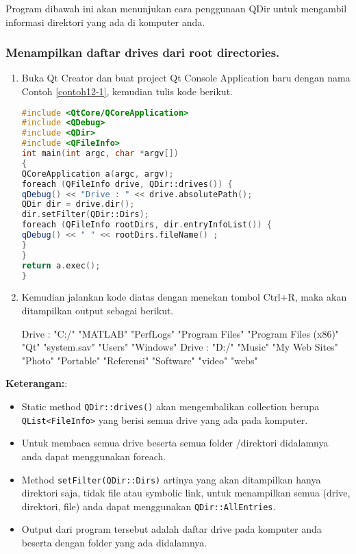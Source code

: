 Program dibawah ini akan menunjukan cara penggunaan QDir untuk mengambil
informasi direktori yang ada di komputer anda.

\subsubsection*{Menampilkan daftar drives dari root directories.}

\begin{enumerate}

\item
  Buka Qt Creator dan buat project Qt Console Application baru dengan
  nama Contoh \ref{contoh12-1}, kemudian tulis kode berikut.

\begin{lstlisting}[language=c++, caption=Menampilkan daftar drives dari root directories., label=contoh12-1]
#include <QtCore/QCoreApplication>
#include <QDebug>
#include <QDir>
#include <QFileInfo>
int main(int argc, char *argv[])
{
QCoreApplication a(argc, argv);
foreach (QFileInfo drive, QDir::drives()) {
qDebug() << "Drive : " << drive.absolutePath();
QDir dir = drive.dir();
dir.setFilter(QDir::Dirs);
foreach (QFileInfo rootDirs, dir.entryInfoList()) {
qDebug() << " " << rootDirs.fileName() ;
}
}
return a.exec();
}
\end{lstlisting}
\item
  Kemudian jalankan kode diatas dengan menekan tombol Ctrl+R, maka akan
  ditampilkan output sebagai berikut.
  \begin{lcverbatim}
Drive :  "C:/"
  "MATLAB"
  "PerfLogs"
  "Program Files"
  "Program Files (x86)"
  "Qt"
  "system.sav"
  "Users"
  "Windows"
Drive :  "D:/"
  "Music"
  "My Web Sites"
  "Photo"
  "Portable"
  "Referensi"
  "Software"
  "video"
  "webs"

\end{lcverbatim}
\end{enumerate}

\textbf{Keterangan:}:

\begin{itemize}

\item
  Static method \texttt{QDir::drives()} akan mengembalikan collection
  berupa \texttt{QList\textless{}FileInfo\textgreater{}} yang berisi
  semua drive yang ada pada komputer.
\item
  Untuk membaca semua drive beserta semua folder /direktori didalamnya
  anda dapat menggunakan foreach.
\item
  Method \texttt{setFilter(QDir::Dirs)} artinya yang akan ditampilkan
  hanya direktori saja, tidak file atau symbolic link, untuk menampilkan
  semua (drive, direktori, file) anda dapat menggunakan
  \texttt{QDir::AllEntries}.
\item
  Output dari program tersebut adalah daftar drive pada komputer anda
  beserta dengan folder yang ada didalamnya.
\end{itemize}

